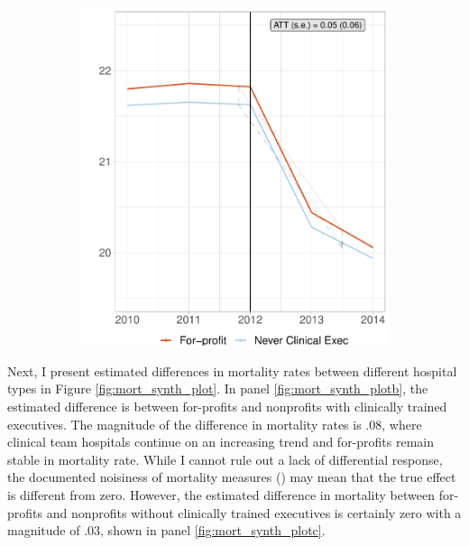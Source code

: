 \documentclass[12pt]{article}
\begin{document}
\begin{figure}[ht!]
\begin{subfigure}[b]{0.45\textwidth}
         \includegraphics[width=\textwidth]{Objects/fp_read_nomd_synth_graph.pdf}
         \label{fig:read_synth_plotc}
     \end{subfigure}
        \label{fig:read_synth_plot}
    \end{figure}

    Next, I present estimated differences in mortality rates between different hospital types in Figure \ref{fig:mort_synth_plot}. In panel \ref{fig:mort_synth_plotb}, the estimated difference is between for-profits and nonprofits with clinically trained executives. The magnitude of the difference in mortality rates is .08, where clinical team hospitals continue on an increasing trend and for-profits remain stable in mortality rate. While I cannot rule out a lack of differential response, the documented noisiness of mortality measures (\cite{mackenzie2016measuring}) may mean that the true effect is different from zero. However, the estimated difference in mortality between for-profits and nonprofits without clinically trained executives is certainly zero with a magnitude of .03, shown in panel \ref{fig:mort_synth_plotc}.  
\end{document}
